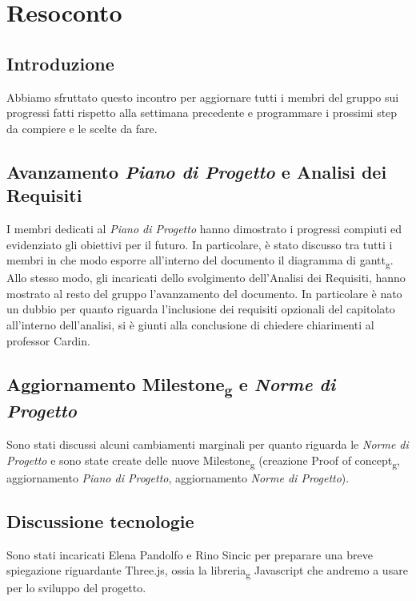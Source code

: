 \section{Resoconto}
\subsection{Introduzione}
Abbiamo sfruttato questo incontro per aggiornare tutti i membri del gruppo sui progressi fatti rispetto alla settimana precedente e programmare i prossimi step da compiere e le scelte da fare.

\subsection{Avanzamento \textit{Piano di Progetto} e Analisi dei Requisiti}
I membri dedicati al \textit{Piano di Progetto} hanno dimostrato i progressi compiuti ed evidenziato gli obiettivi per il futuro. In particolare, è stato discusso tra tutti i membri in che modo esporre all'interno del documento il diagramma di gantt\textsubscript{g}.\\Allo stesso modo, gli incaricati dello svolgimento dell'Analisi dei Requisiti, hanno mostrato al resto del gruppo l'avanzamento del documento. In particolare è nato un dubbio per quanto riguarda l'inclusione dei requisiti opzionali del capitolato all'interno dell'analisi, si è giunti alla conclusione di chiedere chiarimenti al professor Cardin.  


\subsection{Aggiornamento Milestone\textsubscript{g} e \textit{Norme di Progetto}}
Sono stati discussi alcuni cambiamenti marginali per quanto riguarda le \textit{Norme di Progetto} e sono state create delle nuove Milestone\textsubscript{g} (creazione Proof of concept\textsubscript{g}, aggiornamento \textit{Piano di Progetto}, aggiornamento \textit{Norme di Progetto}).

\subsection{Discussione tecnologie}
Sono stati incaricati Elena Pandolfo e Rino Sincic per preparare una breve spiegazione riguardante Three.js, ossia la libreria\textsubscript{g} Javascript che andremo a usare per lo sviluppo del progetto.
